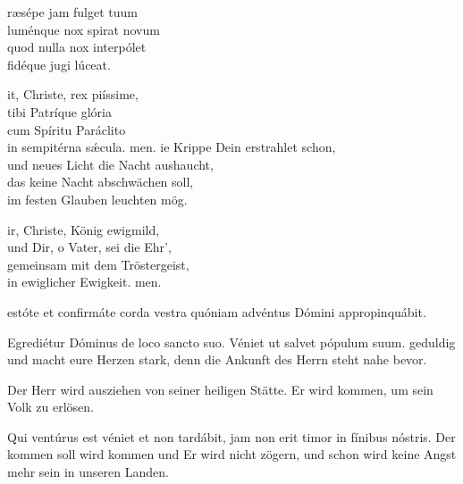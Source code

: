 \documentclass[fontsize=10pt,paper=A5,twoside,BCOR=1mm,DIV=21,headinclude]{scrarticle}
\begin{document}

\vspace{.3em}

\begin{paracol}{2}\pcb
\begin{hymnus}
ræsépe jam fulget tuum\\
luménque nox spirat novum\\
quod nulla nox interpólet\\
fidéque jugi lúceat.

it, Christe, rex piíssime,\\
tibi Patríque glória\\
cum Spíritu Paráclito\\
in sempitérna s\'æcula.
men.
	\switchcolumn
{}ie Krippe Dein erstrahlet schon,\\
und neues Licht die Nacht aushaucht,\\
das keine Nacht abschwächen soll,\\
im festen Glauben leuchten mög.

ir, Christe, König ewigmild,\\
und Dir, o Vater, sei die Ehr',\\
gemeinsam mit dem Tröstergeist,\\
in ewiglicher Ewigkeit.
men.
\end{hymnus}
\end{paracol}



\begin{paracol}{2}\pcb
{} estóte et confirmáte corda vestra quóniam advéntus Dómini appropinquábit.

\V Egrediétur Dóminus de loco sancto suo.
\R Véniet ut salvet pópulum suum.
	\switchcolumn
	 geduldig und macht eure Herzen stark, denn die Ankunft des Herrn steht nahe bevor.

\V Der Herr wird ausziehen von seiner heiligen Stätte.
\R Er wird kommen, um sein Volk zu erlösen.
\end{paracol}


\vspace{.3em}

\begin{paracol}{2}\pcb
\A Qui ventúrus est véniet et non tardábit, jam non erit timor in fínibus nóstris.
	\switchcolumn
	\A Der kommen soll wird kommen und Er wird nicht zögern, und schon wird keine Angst mehr sein in unseren Landen.
\end{paracol}
\end{document}
